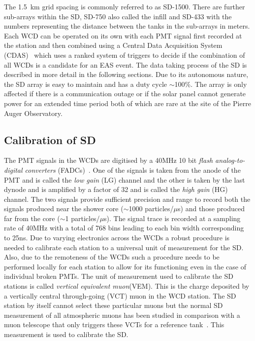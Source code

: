 The 1.5 km grid spacing is commonly referred to as SD-1500. There are further sub-arrays within the SD, SD-750 also called the infill and SD-433 with the numbers representing the distance between the tanks in the sub-arrays in meters. Each WCD can be operated on its own with each PMT signal first recorded at the station and then combined using a Central Data Acquisition System (CDAS)~\cite{Auger:2015} which uses a ranked system of triggers to decide if the combination of all WCDs is a candidate for an EAS event. The data taking process of the SD is described in more detail in the following sections. Due to its autonomous nature, the SD array is easy to maintain and has a duty cycle $\sim$100\%. The array is only affected if there is a communication outage or if the solar panel cannot generate power for an extended time period both of which are rare at the site of the Pierre Auger Observatory.     

\subsection{Calibration of SD}
\label{sec:Sur_det_calib}

The PMT signals in the WCDs are digitised by a 40MHz 10 bit \textit{flash analog-to-digital converters} (FADCs)~\cite{PierreAuger:2005znw}. One of the signals is taken from the anode of the PMT and is called the \textit{low gain} (LG) channel and the other is taken by the last dynode and is amplified by a factor of 32 and is called the \textit{high gain} (HG) channel. The two signals provide sufficient precision and range to record both the signals produced near the shower core ($\sim$1000 particles/$\mu$s) and those produced far from the core ($\sim$1 particles/$\mu$s). The signal trace is recorded at a sampling rate of 40MHz with a total of 768 bins leading to each bin width corresponding to 25ns. Due to varying electronics across the WCDs a robust procedure is needed to calibrate each station to a universal unit of measurement for the SD. Also, due to the remoteness of the WCDs such a procedure needs to be performed locally for each station to allow for its functioning even in the case of individual broken PMTs. The unit of measurement used to calibrate the SD stations is called \textit{vertical equivalent muon}(VEM). This is the charge deposited by a vertically central through-going (VCT) muon in the WCD station. The SD station by itself cannot select these particular muons but the normal SD measurement of all atmospheric muons has been studied in comparison with a muon telescope that only triggers these VCTs for a reference tank~\cite{PierreAuger:2005cju}. This measurement is used to calibrate the SD.

